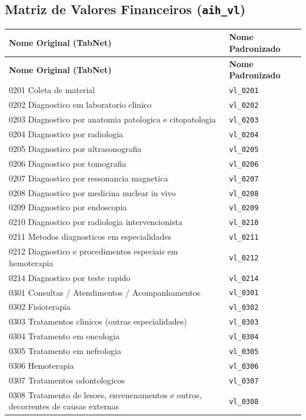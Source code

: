 \documentclass[12pt,a4paper]{report}
\begin{document}
\subsection{Matriz de Valores Financeiros (\texttt{aih\_vl})}
\begin{longtable}{p{11.5cm} l}
\toprule
\textbf{Nome Original (TabNet)} & \textbf{Nome Padronizado} \\
\midrule
\endfirsthead
\toprule
\textbf{Nome Original (TabNet)} & \textbf{Nome Padronizado} \\
\midrule
\endhead
0201 Coleta de material & \texttt{vl\_0201} \\
0202 Diagnostico em laboratorio clinico & \texttt{vl\_0202} \\
0203 Diagnostico por anatomia patologica e citopatologia & \texttt{vl\_0203} \\
0204 Diagnostico por radiologia & \texttt{vl\_0204} \\
0205 Diagnostico por ultrasonografia & \texttt{vl\_0205} \\
0206 Diagnostico por tomografia & \texttt{vl\_0206} \\
0207 Diagnostico por ressonancia magnetica & \texttt{vl\_0207} \\
0208 Diagnostico por medicina nuclear in vivo & \texttt{vl\_0208} \\
0209 Diagnostico por endoscopia & \texttt{vl\_0209} \\
0210 Diagnostico por radiologia intervencionista & \texttt{vl\_0210} \\
0211 Metodos diagnosticos em especialidades & \texttt{vl\_0211} \\
0212 Diagnostico e procedimentos especiais em hemoterapia & \texttt{vl\_0212} \\
0214 Diagnostico por teste rapido & \texttt{vl\_0214} \\
0301 Consultas / Atendimentos / Acompanhamentos & \texttt{vl\_0301} \\
0302 Fisioterapia & \texttt{vl\_0302} \\
0303 Tratamentos clinicos (outras especialidades) & \texttt{vl\_0303} \\
0304 Tratamento em oncologia & \texttt{vl\_0304} \\
0305 Tratamento em nefrologia & \texttt{vl\_0305} \\
0306 Hemoterapia & \texttt{vl\_0306} \\
0307 Tratamentos odontologicos & \texttt{vl\_0307} \\
0308 Tratamento de lesoes, envenenamentos e outros, decorrentes de causas externas & \texttt{vl\_0308} \\

\end{longtable}
\end{document}
